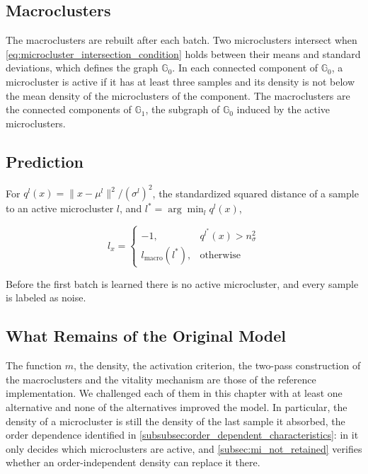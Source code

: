 \subsection{Macroclusters}

The macroclusters are rebuilt after each batch. Two microclusters intersect when \cref{eq:microcluster_intersection_condition} holds between their means and standard deviations, which defines the graph $\mathbb{G}_0$. In each connected component of $\mathbb{G}_0$, a microcluster is active if it has at least three samples and its density is not below the mean density of the microclusters of the component. The macroclusters are the connected components of $\mathbb{G}_1$, the subgraph of $\mathbb{G}_0$ induced by the active microclusters.

\subsection{Prediction}

For $q^l(x) = \lVert x - \mu^l \rVert^2 / (\sigma^l)^2$, the standardized squared distance of a sample to an active microcluster $l$, and $l^* = \arg\min_l q^l(x)$,

\begin{equation}
    l_x =
    \begin{cases}
        -1, & q^{l^*}(x) > n_\sigma^2 \\[2pt]
        l_\text{macro}(l^*), & \text{otherwise}
    \end{cases}
    \label{eq:mi_final_prediction}
\end{equation}

Before the first batch is learned there is no active microcluster, and every sample is labeled as noise.

\subsection{What Remains of the Original Model}

The function $m$, the density, the activation criterion, the two-pass construction of the macroclusters and the vitality mechanism are those of the reference implementation. We challenged each of them in this chapter with at least one alternative and none of the alternatives improved the model. In particular, the density of a microcluster is still the density of the last sample it absorbed, the order dependence identified in \cref{subsubsec:order_dependent_characteristics}: in \MicroTEDAClusPlus it only decides which microclusters are active, and \cref{subsec:mi_not_retained} verifies whether an order-independent density can replace it there.

